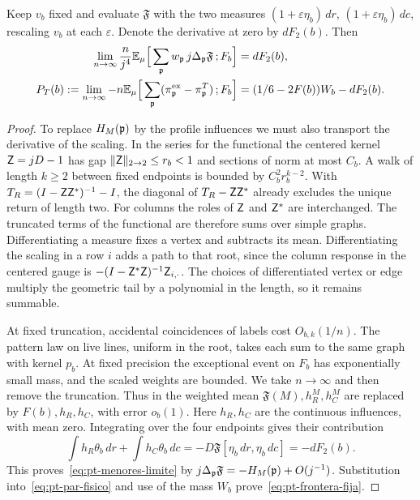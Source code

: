 \begin{proposicion}\label{prop:pt-corte}
Keep \(v_b\) fixed and evaluate \(\mathfrak F\) with the two measures \((1+\varepsilon\eta_b)\,dr\),
\((1+\varepsilon\eta_b)\,dc\), rescaling \(v_b\) at each \(\varepsilon\). Denote the derivative at zero
by \(dF_2(b)\). Then
\begin{align}
 \lim_{n\to\infty}\frac n{j^4}\mathbb E_\mu
 \Big[\sum_{\mathfrak p} w_{\mathfrak p}\,j\Delta_{\mathfrak p}\mathfrak F\,;F_b\Big]&=dF_2(b),
 \label{eq:pt-menores-limite}\\
 P_T(b):=\lim_{n\to\infty}-n\mathbb E_\mu
 \Big[\sum_{\mathfrak p}(\pi_{\mathfrak p}^{\rm ex}-\pi_{\mathfrak p}^T)\,;F_b\Big]&=(1/6-2F(b))W_b-dF_2(b).
 \label{eq:pt-frontera-fija}
\end{align}
\end{proposicion}
\begin{proof}
To replace \(H_M(\mathfrak p)\) by the profile influences we must also transport the derivative of the
scaling. In the series for the functional the centered kernel \(\mathsf Z=jD-1\) has gap
\(\|\mathsf Z\|_{2\to2}\le r_b<1\) and sections of norm at most \(C_b\). A walk of length \(k\ge2\)
between fixed endpoints is bounded by \(C_b^2r_b^{k-2}\). With \(T_R=(I-\mathsf Z\mathsf Z^*)^{-1}-I\),
the diagonal of \(T_R-\mathsf Z\mathsf Z^*\) already excludes the unique return of length two.
For columns the roles of \(\mathsf Z\) and \(\mathsf Z^*\) are interchanged. The truncated terms of the
functional are therefore sums over simple graphs. Differentiating a measure fixes a vertex and subtracts
its mean. Differentiating the scaling in a row \(i\) adds a path to that root, since the column response
in the centered gauge is \(-(I-\mathsf Z^*\mathsf Z)^{-1}\mathsf Z_{i,\cdot}\). The choices of
differentiated vertex or edge multiply the geometric tail by a polynomial in the length, so it remains
summable.

At fixed truncation, accidental coincidences of labels cost \(O_{b,k}(1/n)\). The pattern law on live
lines, uniform in the root, takes each sum to the same graph with kernel \(p_b\). At fixed precision the
exceptional event on \(F_b\) has exponentially small mass, and the scaled weights are bounded. We take
\(n\to\infty\) and then remove the truncation. Thus in the weighted mean \(\mathfrak F(M),h_R^M,h_C^M\)
are replaced by \(F(b),h_R,h_C\), with error \(o_b(1)\). Here \(h_R,h_C\) are the continuous influences,
with mean zero. Integrating over the four endpoints gives their contribution
\[
 \int h_R\theta_b\,dr+\int h_C\theta_b\,dc
 =-D\mathfrak F[\eta_b\,dr,\eta_b\,dc]=-dF_2(b).
\]
This proves~\eqref{eq:pt-menores-limite} by \(j\Delta_{\mathfrak p}\mathfrak F=-H_M(\mathfrak p)+O(j^{-1})\).
Substitution into~\eqref{eq:pt-par-fisico} and use of the mass \(W_b\)
prove~\eqref{eq:pt-frontera-fija}.
\end{proof}
